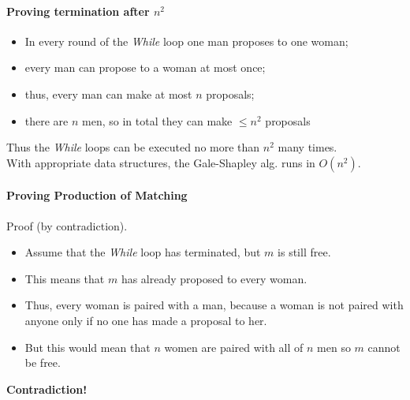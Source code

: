 \paragraph{Proving termination after $n^2$}
\begin{itemize}
    \item In every round of the \textit{While} loop one man proposes to one woman;
    \item every man can propose to a woman at most once;
    \item thus, every man can make at most $n$ proposals;
    \item there are $n$ men, so in total they can make $\leq n^2$ proposals
\end{itemize}
Thus the \textit{While} loops can be executed no more than $n^2$ many times.\\
With appropriate data structures, the Gale-Shapley alg. runs in $O(n^2).$

\paragraph{Proving Production of Matching} 
Proof (by contradiction).
\begin{itemize}
    \item Assume that the \textit{While} loop has terminated, but $m$ is still free.
    \item This means that $m$ has already proposed to every woman.
    \item Thus, every woman is paired with a man, because a woman is not paired with
    anyone only if no one has made a proposal to her.
    \item But this would mean that $n$ women are paired with all of $n$ men so
    $m$ cannot be free.
\end{itemize}
\textbf{Contradiction!}

